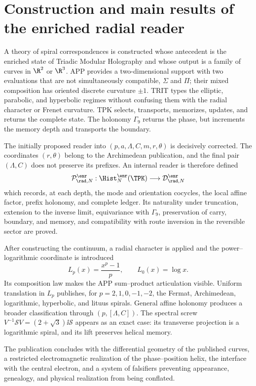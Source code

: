 \part{Construction and main results of the enriched radial reader}
A theory of spiral correspondences is constructed whose antecedent is
the enriched state of Triadic Modular Holography and whose output is a
family of curves in \(\R^2\) or \(\R^3\). APP provides a
two-dimensional support with two evaluations that are not simultaneously compatible,
\(\Sigma\) and \(\Pi\); their mixed composition has oriented discrete
curvature \(\pm1\). TRIT types the elliptic, parabolic, and
hyperbolic regimes without confusing them with the radial character or Frenet
curvature. TPK selects, transports, memorizes, updates, and returns the complete
state. The holonomy \(\Gamma_9\) returns the phase, but increments the
memory depth and transports the boundary.

The initially proposed reader into
\((p,a,\Lambda,C,m,r,\theta)\) is decisively corrected. The
coordinates \((r,\theta)\) belong to the Archimedean publication, and the
final pair \((\Lambda,C)\) does not preserve its prefixes. An internal
reader is therefore defined
\[
 \mathcal P^{\enr}_{\rad,N}:\Hist_N^{\enr}(\TPK)
 \longrightarrow \mathcal D^{\enr}_{\rad,N}
\]
which records, at each depth, the mode and orientation cocycles, the
local affine factor, prefix holonomy, and complete ledger. Its
naturality under truncation, extension to the inverse limit,
equivariance with \(\Gamma_9\), preservation of carry, boundary, and
memory, and compatibility with route inversion in the reversible
sector are proved.

After constructing the continuum, a radial character is applied and the
power--logarithmic coordinate is introduced
\[
 L_p(x)=\frac{x^p-1}{p},\qquad L_0(x)=\log x.
\]
Its composition law makes the APP sum--product articulation visible.
Uniform translation in \(L_p\) publishes, for
\(p=2,1,0,-1,-2\), the Fermat, Archimedean, logarithmic,
hyperbolic, and lituus spirals. General affine holonomy produces a broader
classification through \((p,[\Lambda,C])\). The spectral screw
\(V^{-1}\mathscr SV=(2+\sqrt3)\ii\mathscr S\) appears as an exact case:
its transverse projection is a logarithmic spiral, and its lift preserves
helical memory.

The publication concludes with the differential geometry of the published
curves, a restricted electromagnetic realization of the phase--position
helix, the interface with the central electron, and a system of
falsifiers preventing appearance, genealogy, and physical realization from being
conflated.


